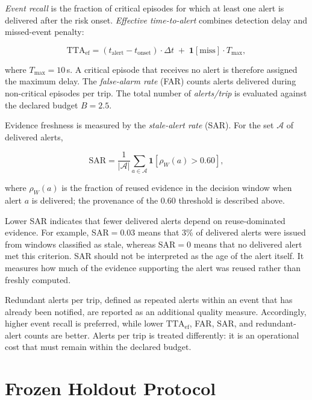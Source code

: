 \documentclass[conference]{IEEEtran}
\newcommand{\ttaef}{\mathrm{TTA}_{\mathrm{ef}}}
\begin{document}
\emph{Event recall} is the fraction of critical episodes for which at
least one alert is delivered after the risk onset. \emph{Effective
time-to-alert} combines detection delay and missed-event penalty:

\begin{equation}
\ttaef=(t_{\mathrm{alert}}-t_{\mathrm{onset}})\cdot\Delta t
 \;+\;\mathbf{1}[\mathrm{miss}]\cdot T_{\max},
\label{eq:ttaef}
\end{equation}

where $T_{\max}{=}10$\,s. A critical episode that receives no alert is
therefore assigned the maximum delay. The \emph{false-alarm rate}
(FAR) counts alerts delivered during non-critical episodes per trip. The total number of
\emph{alerts/trip} is evaluated against the declared budget
$B{=}2.5$.

Evidence freshness is measured by the \emph{stale-alert rate} (SAR).
For the set $\mathcal{A}$ of delivered alerts,

\begin{equation}
\mathrm{SAR}=\frac{1}{|\mathcal{A}|}\sum_{a\in\mathcal{A}}
 \mathbf{1}\!\left[\rho_W(a) > 0.60\right],
\label{eq:sar}
\end{equation}

where $\rho_W(a)$ is the fraction of reused evidence in the decision
window when alert $a$ is delivered; the provenance of the $0.60$
threshold is described above.

Lower SAR indicates that fewer delivered alerts depend on
reuse-dominated evidence. For example, SAR${=}0.03$ means that 3\% of
delivered alerts were issued from windows classified as stale, whereas
SAR${=}0$ means that no delivered alert met this criterion. SAR should not
be interpreted as the age of the alert itself. It measures how much of the
evidence supporting the alert was reused rather than freshly computed.

Redundant alerts per trip, defined as repeated alerts within an event that
has already been notified, are reported as an additional quality measure.
Accordingly, higher event recall is preferred, while lower
$\ttaef$, FAR, SAR, and redundant-alert counts are better.
Alerts per trip is treated differently: it is an operational cost that
must remain within the declared budget.

\section{Frozen Holdout Protocol}
\label{sec:protocol}
\end{document}
